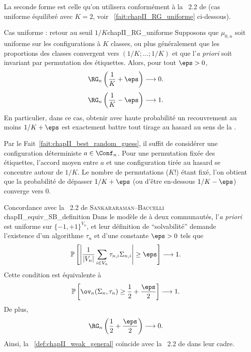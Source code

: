 La seconde forme est celle qu'on utilisera conformément à la \Def~2.2 de \SB{} \cite{SankararamanBaccelli2018} (cas uniforme équilibré avec $K=2$, voir \Fact~\ref{fait:chapII_RG_uniforme} ci-dessous). %

\begin{Fait}{Cas uniforme : retour au seuil $1/K$}{chapII_RG_uniforme}
Supposons que $\mu_{0,n}$ soit uniforme sur les configurations à $K$ classes, ou plus généralement que les proportions des classes convergent vers $(1/K ; \ldots ;1/K)$ et que l'\emph{a priori} soit invariant par permutation des étiquettes. Alors, pour tout $\eps>0$,
\[
    \RG_n\left(\frac1K+\eps\right)\longrightarrow0.
\]\[
    \RG_n\left(\frac1K-\eps\right)\longrightarrow1.
\]
En particulier, dans ce cas, obtenir avec haute probabilité un recouvrement au moins $1/K+\eps$ est exactement battre tout tirage au hasard au sens de la .
\end{Fait}

\begin{Preuve}
Par le Fait~\ref{fait:chapII_best_random_guess}, il suffit de considérer une configuration déterministe $a\in\Conf_n$. Pour une permutation fixée des étiquettes, l'accord moyen entre $a$ et une configuration tirée au hasard se concentre autour de $1/K$. Le nombre de permutations ($K!$) étant fixé, l'on obtient que la probabilité de dépasser $1/K+\eps$ (ou d'être en-dessous $1/K-\eps$) converge vers $0$.
\end{Preuve}

\begin{Fait}{Concordance avec la \Def~2.2 de \textsc{Sankararaman--Baccelli} \cite{SankararamanBaccelli2018}}{chapII_equiv_SB_definition}
Dans le modèle de \SB{} à deux communautés, l'\emph{a priori} est uniforme sur $\{-1,+1\}^{V_n}$, et leur définition de ``solvabilité'' demande l'existence d'un algorithme $\tau_n$ et d'une constante $\eps>0$ tels que
\begin{equation}
    \mathbb P\left[\left|\frac1{|V_n|}\sum_{i\in V_n}\tau_{n,i}\Sigma_{n,i}\right|\ge \eps\right]\longrightarrow1.
    \label{eq:chapII_SB_definition_rewrite}
\end{equation}
Cette condition est équivalente à
\begin{equation}
    \mathbb P\left[\ov_n(\Sigma_n,\tau_n)\ge \frac12+\frac \eps 2\right]\longrightarrow1.
    \label{eq:chapII_SB_definition_overlap}
\end{equation}
De plus,
\begin{equation}
    \RG_n\left(\frac12+\frac \eps 2\right)\longrightarrow0.
    \label{eq:chapII_SB_RG_zero}
\end{equation}
Ainsi, la \Def~\ref{def:chapII_weak_general} coïncide avec la \Def~2.2 de \SB{} dans leur cadre.
\end{Fait}

